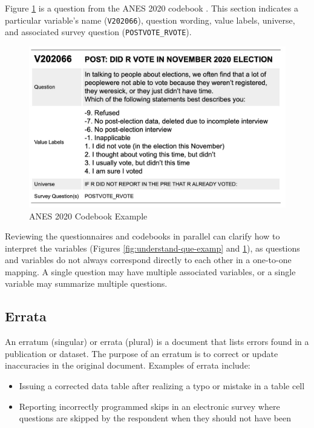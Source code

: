 \documentclass[
]{krantz}
\providecommand{\tightlist}{%
  \setlength{\itemsep}{0pt}\setlength{\parskip}{0pt}}
\begin{document}
Figure \ref{fig:understand-codebook-examp} is a question from the ANES 2020 codebook \citep{anes-cb}. This section indicates a particular variable's name (\texttt{V202066}), question wording, value labels, universe, and associated survey question (\texttt{POSTVOTE\_RVOTE}).

\begin{figure}
\includegraphics{images/codebook-example} \caption{ANES 2020 Codebook Example}\label{fig:understand-codebook-examp}
\end{figure}

Reviewing the questionnaires and codebooks in parallel can clarify how to interpret the variables (Figures \ref{fig:understand-que-examp} and \ref{fig:understand-codebook-examp}), as questions and variables do not always correspond directly to each other in a one-to-one mapping. A single question may have multiple associated variables, or a single variable may summarize multiple questions.

\hypertarget{errata}{%
\subsection{Errata}\label{errata}}

An erratum (singular) or errata (plural) is a document that lists errors found in a publication or dataset. The purpose of an erratum is to correct or update inaccuracies in the original document. Examples of errata include:

\begin{itemize}
\tightlist
\item
  Issuing a corrected data table after realizing a typo or mistake in a table cell
\item
  Reporting incorrectly programmed skips in an electronic survey where questions are skipped by the respondent when they should not have been
\end{itemize}
\end{document}
